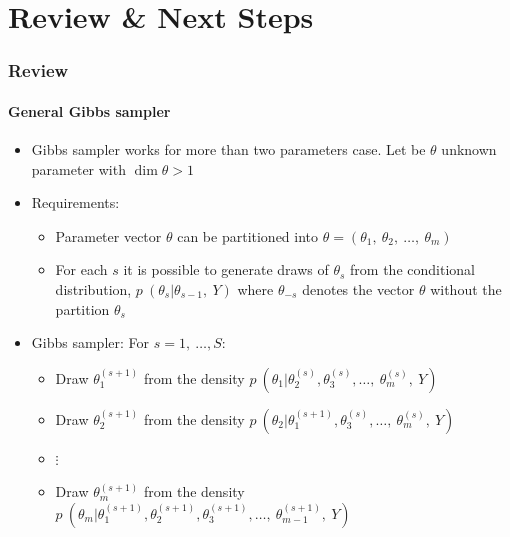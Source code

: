 \documentclass[
  shownotes,
  xcolor={svgnames},
  hyperref={colorlinks,citecolor=DarkBlue,linkcolor=DarkRed,urlcolor=DarkBlue}
  , aspectratio=169]{beamer}
\begin{document}
\section{Review \& Next Steps}
\begin{frame}[fragile]
\frametitle{Review} 
\framesubtitle{General Gibbs sampler}


\begin{itemize}
\item Gibbs sampler works for more than two parameters case. Let be $\theta$ unknown parameter with $\dim{\theta > 1}$



\item Requirements:
    \begin{itemize}
        \item Parameter vector $\theta$ can be partitioned into $\theta =  (\theta_{1},\ \theta_{2},\ \ldots,\ \theta_{m} )$
        \item For each $s$ it is possible to generate draws of $\theta_{s}$ from the conditional distribution, $p\ (\theta_{s}|\theta_{s - 1},\ Y)$ where $\theta_{- s}$ denotes the vector $\theta$ without the partition $\theta_{s}$
    \end{itemize}
    \item Gibbs sampler: For $s = 1,\ \ldots, S:$
    
    \begin{itemize}
        \item Draw $\theta_{1}^{(s + 1)}$ from the density $p\ (\theta_{1}|\theta_{2}^{\left( s \right)},\theta_{3}^{\left( s \right)},\ldots,\ \theta_{m}^{\left( s \right)},\ Y)\ $

        \item Draw $\theta_{2}^{(s + 1)}$ from the density $p\ (\theta_{2}|\theta_{1}^{\left( s+1 \right)},\theta_{3}^{\left( s \right)},\ldots,\ \theta_{m}^{\left( s \right)},\ Y)\ $

        \item $\vdots$

        \item Draw $\theta_{m}^{(s + 1)}$ from the density
        $p\ (\theta_{m}|\theta_{1}^{\left( s +1 \right)},\theta_{2}^{\left( s+1 \right)},\theta_{3}^{\left( s+1 \right)},\ldots,\ \theta_{m - 1}^{\left( s + 1 \right)},\ Y)\ $
    \end{itemize}

\end{itemize}




\end{frame}
\end{document}
